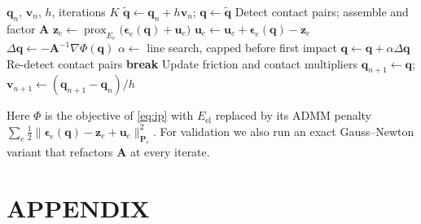 \documentclass[letterpaper, 10 pt, conference]{ieeeconf}  %
\newcommand{\solver}{DiSMech Newton}
\begin{document}
\begin{algorithm}[t]
    \caption{\solver{} time step}
    \label{alg:step}
    \begin{algorithmic}[1]
        \Require $\mathbf{q}_n$, $\mathbf{v}_n$, $h$, iterations $K$
        \State $\tilde{\mathbf{q}} \gets \mathbf{q}_n + h\mathbf{v}_n$; $\mathbf{q} \gets \tilde{\mathbf{q}}$ 
        \State Detect contact pairs; assemble and factor $\mathbf{A}$
             
                \State $\mathbf{z}_e \gets \operatorname{prox}_{E_e}\!\big(\boldsymbol{\epsilon}_e(\mathbf{q}) + \mathbf{u}_e\big)$
                \State $\mathbf{u}_e \gets \mathbf{u}_e + \boldsymbol{\epsilon}_e(\mathbf{q}) - \mathbf{z}_e$
            \EndFor
            \State $\Delta\mathbf{q} \gets -\mathbf{A}^{-1}\nabla\Phi(\mathbf{q})$ 
            \State $\alpha \gets$ line search, capped before first impact
            \State $\mathbf{q} \gets \mathbf{q} + \alpha\Delta\mathbf{q}$
                \State Re-detect contact pairs
            \EndIf
             \textbf{break} \EndIf
            \State Update friction and contact multipliers
        \EndFor
        \State $\mathbf{q}_{n+1} \gets \mathbf{q}$; $\mathbf{v}_{n+1} \gets (\mathbf{q}_{n+1} - \mathbf{q}_n)/h$
    \end{algorithmic}
\end{algorithm}

Here $\Phi$ is the objective of \eqref{eq:ip} with $E_\text{el}$ replaced by its ADMM penalty $\sum_e \tfrac{1}{2}\|\boldsymbol{\epsilon}_e(\mathbf{q}) - \mathbf{z}_e + \mathbf{u}_e\|^2_{\mathbf{P}_e}$.
For validation we also run an exact Gauss--Newton variant that refactors $\mathbf{A}$ at every iterate.


\addtolength{\textheight}{-12cm}   %







\section*{APPENDIX}


\end{document}
